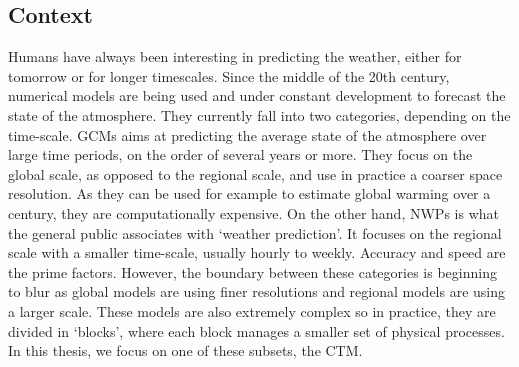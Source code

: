 \subsection*{Context}
Humans have always been interesting in predicting the weather, either for
tomorrow or for longer timescales. Since the middle of the 20th century,
numerical models are being used and under constant development to forecast the
state of the atmosphere. They currently fall into two categories, depending on
the time-scale. \glspl{GCM} aims at predicting the average state of the atmosphere
over large time periods, on the order of several years or more. They focus on
the global scale, as opposed to the regional scale, and use in practice a
coarser space resolution. As they can be used for example to estimate global
warming over a century, they are computationally expensive. On the
other hand, \glspl{NWP} is what the general public associates with `weather
prediction'. It focuses on the regional scale with a smaller time-scale,
usually hourly to weekly. Accuracy and speed are the prime factors.
However, the boundary between these categories is beginning to blur as global
models are using finer resolutions and regional models are using a larger scale.
These models are also extremely complex so in practice, they are divided in
`blocks', where each block manages a smaller set of physical processes. In this
thesis, we focus on one of these subsets, the \gls{CTM}.

